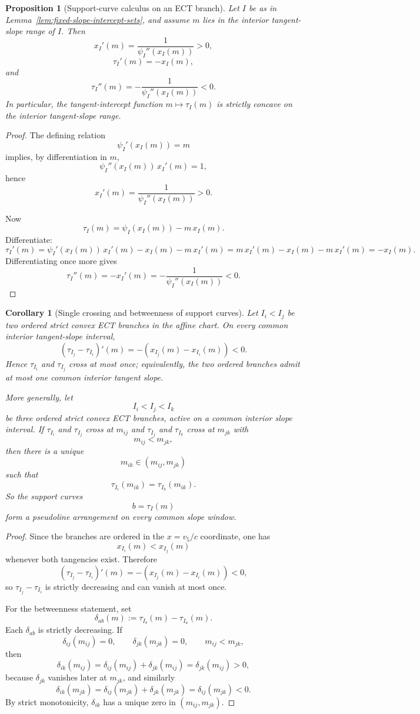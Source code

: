 \documentclass[11pt,a4paper]{amsart}
\theoremstyle{plain}
\newtheorem{proposition}[theorem]{Proposition}
\newtheorem{corollary}[theorem]{Corollary}
\theoremstyle{definition}
\begin{document}
\begin{proposition}[Support-curve calculus on an ECT branch]
\label{prop:support-curve-calculus-ect}
Let $I$ be as in Lemma~\ref{lem:fixed-slope-intercept-sets}, and assume $m$
lies in the interior tangent-slope range of $I$. Then
\[
x_I'(m)=\frac{1}{\psi_I''(x_I(m))}>0,
\]
\[
\tau_I'(m)=-x_I(m),
\]
and
\[
\tau_I''(m)=-\frac{1}{\psi_I''(x_I(m))}<0.
\]
In particular, the tangent-intercept function $m\mapsto \tau_I(m)$ is strictly
concave on the interior tangent-slope range.
\end{proposition}

\begin{proof}
The defining relation
\[
\psi_I'(x_I(m))=m
\]
implies, by differentiation in $m$,
\[
\psi_I''(x_I(m))\,x_I'(m)=1,
\]
hence
\[
x_I'(m)=\frac{1}{\psi_I''(x_I(m))}>0.
\]

Now
\[
\tau_I(m)=\psi_I(x_I(m))-m\,x_I(m).
\]
Differentiate:
\[
\tau_I'(m)
=
\psi_I'(x_I(m))\,x_I'(m)-x_I(m)-m\,x_I'(m)
=
m\,x_I'(m)-x_I(m)-m\,x_I'(m)
=
-x_I(m).
\]
Differentiating once more gives
\[
\tau_I''(m)=-x_I'(m)=-\frac{1}{\psi_I''(x_I(m))}<0.
\]
\end{proof}

\begin{corollary}[Single crossing and betweenness of support curves]
\label{cor:single-crossing-betweenness-support-curves}
Let $I_i<I_j$ be two ordered strict convex ECT branches in the affine chart.
On every common interior tangent-slope interval,
\[
(\tau_{I_j}-\tau_{I_i})'(m)=-(x_{I_j}(m)-x_{I_i}(m))<0.
\]
Hence $\tau_{I_i}$ and $\tau_{I_j}$ cross at most once; equivalently, the two
ordered branches admit at most one common interior tangent slope.

More generally, let
\[
I_i<I_j<I_k
\]
be three ordered strict convex ECT branches, active on a common interior slope
interval. If $\tau_{I_i}$ and $\tau_{I_j}$ cross at $m_{ij}$ and
$\tau_{I_j}$ and $\tau_{I_k}$ cross at $m_{jk}$ with
\[
m_{ij}<m_{jk},
\]
then there is a unique
\[
m_{ik}\in(m_{ij},m_{jk})
\]
such that
\[
\tau_{I_i}(m_{ik})=\tau_{I_k}(m_{ik}).
\]
So the support curves
\[
b=\tau_I(m)
\]
form a pseudoline arrangement on every common slope window.
\end{corollary}

\begin{proof}
Since the branches are ordered in the $x=v_5/c$ coordinate, one has
\[
x_{I_i}(m)<x_{I_j}(m)
\]
whenever both tangencies exist. Therefore
\[
(\tau_{I_j}-\tau_{I_i})'(m)=-(x_{I_j}(m)-x_{I_i}(m))<0,
\]
so $\tau_{I_j}-\tau_{I_i}$ is strictly decreasing and can vanish at most once.

For the betweenness statement, set
\[
\delta_{ab}(m):=\tau_{I_b}(m)-\tau_{I_a}(m).
\]
Each $\delta_{ab}$ is strictly decreasing. If
\[
\delta_{ij}(m_{ij})=0,\qquad \delta_{jk}(m_{jk})=0,\qquad m_{ij}<m_{jk},
\]
then
\[
\delta_{ik}(m_{ij})
=
\delta_{ij}(m_{ij})+\delta_{jk}(m_{ij})
=
\delta_{jk}(m_{ij})>0,
\]
because $\delta_{jk}$ vanishes later at $m_{jk}$, and similarly
\[
\delta_{ik}(m_{jk})
=
\delta_{ij}(m_{jk})+\delta_{jk}(m_{jk})
=
\delta_{ij}(m_{jk})<0.
\]
By strict monotonicity, $\delta_{ik}$ has a unique zero in $(m_{ij},m_{jk})$.
\end{proof}
\end{document}
